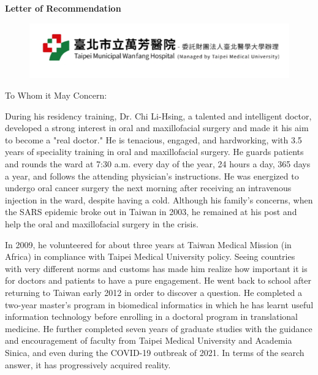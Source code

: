 \documentclass{letter}
\date{}
\begin{document}
\begin{letter}
{
\centering \Large \textbf{Letter of Recommendation}
}

\hfill
\begin{figure}%
    \includegraphics[width=0.3\textheight]{TMWH.png}
\end{figure}

\opening{To Whom it May Concern:} %
\medskip 

During his residency training, Dr. Chi Li-Hsing, a talented and intelligent doctor, developed a strong interest in oral and maxillofacial surgery and made it his aim to become a "real doctor."
He is tenacious, engaged, and hardworking, with 3.5 years of speciality training in oral and maxillofacial surgery.
He guards patients and rounds the ward at 7:30 a.m. every day of the year, 24 hours a day, 365 days a year, and follows the attending physician's instructions. He was energized to undergo oral cancer surgery the next morning after receiving an intravenous injection in the ward, despite having a cold.
Although his family's concerns, when the SARS epidemic broke out in Taiwan in 2003, he remained at his post and help the oral and maxillofacial surgery in the crisis.

In 2009, he volunteered for about three years at Taiwan Medical Mission (in Africa) in compliance with Taipei Medical University policy. Seeing countries with very different norms and customs has made him realize how important it is for doctors and patients to have a pure engagement. He went back to school after returning to Taiwan early 2012 in order to discover a question. He completed a two-year master's program in biomedical informatics in which he has learnt useful information technology before enrolling in a doctoral program in translational medicine. He further completed seven years of graduate studies with the guidance and encouragement of faculty from Taipei Medical University and Academia Sinica, and even during the COVID-19 outbreak of 2021. In terms of the search answer, it has progressively acquired reality.



\end{letter}
\end{document}
